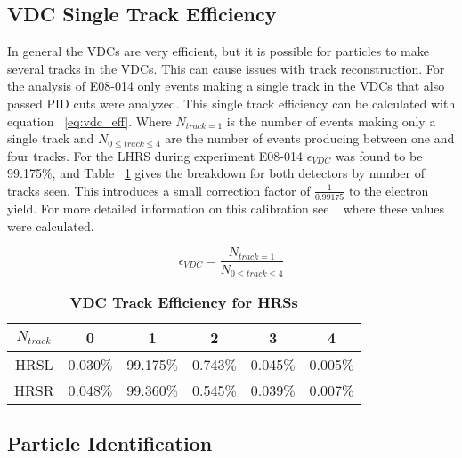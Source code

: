 \subsection{VDC Single Track Efficiency}
\label{ssec:vdc_eff}

In general the VDCs are very efficient, but it is possible for particles to make several tracks in the VDCs. This can cause issues with track reconstruction. For the analysis of E08-014 only events making a single track in the VDCs that also passed PID cuts were analyzed. This single track efficiency can be calculated with equation ~\ref{eq:vdc_eff}. Where $N_{track=1}$ is the number of events making only a single track and $N_{0 \leq track \leq 4}$ are the number of events producing between one and four tracks. For the LHRS during experiment E08-014 $\epsilon_{VDC}$ was found to be 99.175$\%$, and Table ~\ref{tab:vdc_eff} gives the breakdown for both detectors by number of tracks seen. This introduces a small correction factor of $\frac{1}{0.99175}$ to the electron yield. For more detailed information on this calibration see ~\cite{Thesis:Ye} where these values were calculated. 

\begin{equation} \label{eq:vdc_eff}
	\epsilon_{VDC} = \frac{N_{track=1}}{N_{0 \leq track \leq 4}}
\end{equation}

\begin{table}[!h]
\centering
\begin{tabular}{|c c c c c c|}
\hline
\textbf{$N_{track}$} & \textbf{0} & \textbf{1} & \textbf{2} & \textbf{3} & \textbf{4}\\
\hline
HRSL & 0.030$\%$ & 99.175$\%$ & 0.743$\%$ & 0.045$\%$ & 0.005$\%$ \\  
HRSR & 0.048$\%$ & 99.360$\%$ & 0.545$\%$ & 0.039$\%$ & 0.007$\%$ \\ 
\hline
\end{tabular}
\caption{{\bf{VDC Track Efficiency for HRSs}} }
\label{tab:vdc_eff}
\end{table}

\subsection{Particle Identification}
\label{ssec:pid}

